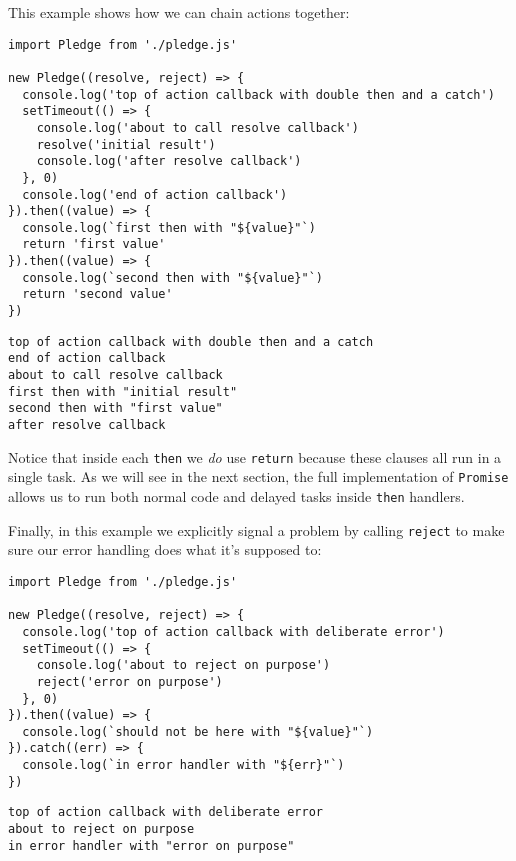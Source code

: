 \documentclass[krantzl]{krantz}
\begin{document}
This example shows how we can chain actions together:


\begin{lstlisting}[frame=tblr]
import Pledge from './pledge.js'

new Pledge((resolve, reject) => {
  console.log('top of action callback with double then and a catch')
  setTimeout(() => {
    console.log('about to call resolve callback')
    resolve('initial result')
    console.log('after resolve callback')
  }, 0)
  console.log('end of action callback')
}).then((value) => {
  console.log(`first then with "${value}"`)
  return 'first value'
}).then((value) => {
  console.log(`second then with "${value}"`)
  return 'second value'
})
\end{lstlisting}



\begin{lstlisting}[frame=tblr,backgroundcolor=\color{black!5}]
top of action callback with double then and a catch
end of action callback
about to call resolve callback
first then with "initial result"
second then with "first value"
after resolve callback
\end{lstlisting}



\noindent Notice that inside each \texttt{then} we \emph{do} use \texttt{return}
because these clauses all run in a single task.
As we will see in the next section,
the full implementation of \texttt{Promise} allows us to run both normal code
and delayed tasks inside \texttt{then} handlers.


Finally,
in this example we explicitly signal a problem by calling \texttt{reject}
to make sure our error handling does what it’s supposed to:


\begin{lstlisting}[frame=tblr]
import Pledge from './pledge.js'

new Pledge((resolve, reject) => {
  console.log('top of action callback with deliberate error')
  setTimeout(() => {
    console.log('about to reject on purpose')
    reject('error on purpose')
  }, 0)
}).then((value) => {
  console.log(`should not be here with "${value}"`)
}).catch((err) => {
  console.log(`in error handler with "${err}"`)
})
\end{lstlisting}



\begin{lstlisting}[frame=tblr,backgroundcolor=\color{black!5}]
top of action callback with deliberate error
about to reject on purpose
in error handler with "error on purpose"
\end{lstlisting}
\end{document}
